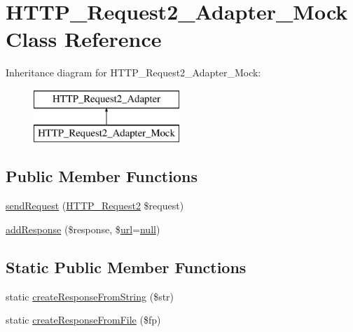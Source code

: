 \hypertarget{classHTTP__Request2__Adapter__Mock}{}\section{H\+T\+T\+P\+\_\+\+Request2\+\_\+\+Adapter\+\_\+\+Mock Class Reference}
\label{classHTTP__Request2__Adapter__Mock}
Inheritance diagram for H\+T\+T\+P\+\_\+\+Request2\+\_\+\+Adapter\+\_\+\+Mock\+:\begin{figure}[H]
\begin{center}
\leavevmode
\includegraphics[height=2.000000cm]{classHTTP__Request2__Adapter__Mock}
\end{center}
\end{figure}
\subsection*{Public Member Functions}
\begin{DoxyCompactItemize}
\item 
\hyperlink{classHTTP__Request2__Adapter__Mock_ab85697c5438cc9b4c834ac6f15c46247}{send\+Request} (\hyperlink{classHTTP__Request2}{H\+T\+T\+P\+\_\+\+Request2} \$request)
\item 
\hyperlink{classHTTP__Request2__Adapter__Mock_a35bbf7a977f9711d4a965b220e11c291}{add\+Response} (\$response, \$\hyperlink{swfupload_8js_a440a52a9004fdab0700100a6ddb49f67}{url}=\hyperlink{modernizr_8min_8js_a286f9ec831c5e676eeb493248eab9575}{null})
\end{DoxyCompactItemize}
\subsection*{Static Public Member Functions}
\begin{DoxyCompactItemize}
\item 
static \hyperlink{classHTTP__Request2__Adapter__Mock_a0732ba355bbab5c382378be5169084f0}{create\+Response\+From\+String} (\$str)
\item 
static \hyperlink{classHTTP__Request2__Adapter__Mock_ae767247efbe46fa5f1d5bf4363c2eb52}{create\+Response\+From\+File} (\$fp)
\end{DoxyCompactItemize}

